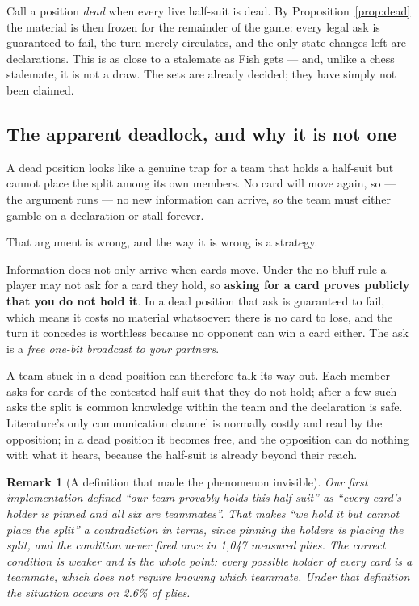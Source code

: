 \documentclass[11pt,a4paper]{article}
\newtheorem{remark}{Remark}
\begin{document}
Call a position \emph{dead} when every live half-suit is dead. By
Proposition~\ref{prop:dead} the material is then frozen for the remainder of the
game: every legal ask is guaranteed to fail, the turn merely circulates, and the
only state changes left are declarations. This is as close to a stalemate as
Fish gets --- and, unlike a chess stalemate, it is not a draw. The sets are
already decided; they have simply not been claimed.

\subsection{The apparent deadlock, and why it is not one}

A dead position looks like a genuine trap for a team that holds a half-suit but
cannot place the split among its own members. No card will move again, so
--- the argument runs --- no new information can arrive, so the team must either
gamble on a declaration or stall forever.

That argument is wrong, and the way it is wrong is a strategy.

Information does not only arrive when cards move. Under the no-bluff rule a
player may not ask for a card they hold, so \textbf{asking for a card proves
publicly that you do not hold it}. In a dead position that ask is guaranteed to
fail, which means it costs no material whatsoever: there is no card to lose, and
the turn it concedes is worthless because no opponent can win a card either. The
ask is a \emph{free one-bit broadcast to your partners}.

A team stuck in a dead position can therefore talk its way out. Each member asks
for cards of the contested half-suit that they do not hold; after a few such
asks the split is common knowledge within the team and the declaration is safe.
Literature's only communication channel is normally costly and read by the
opposition; in a dead position it becomes free, and the opposition can do
nothing with what it hears, because the half-suit is already beyond their reach.

\begin{remark}[A definition that made the phenomenon invisible]
Our first implementation defined ``our team provably holds this half-suit'' as
``every card's holder is pinned and all six are teammates''. That makes ``we hold
it but cannot place the split'' a contradiction in terms, since pinning the
holders \emph{is} placing the split, and the condition never fired once in 1,047
measured plies. The correct condition is weaker and is the whole point: every
\emph{possible} holder of every card is a teammate, which does not require
knowing which teammate. Under that definition the situation occurs on 2.6\% of
plies.
\end{remark}
\end{document}
